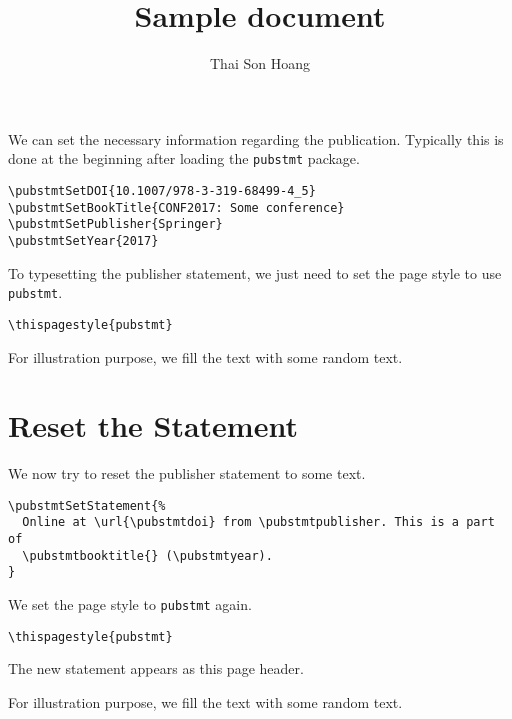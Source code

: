 \usepackage{lipsum}


\title{Sample document}
\author{Thai Son Hoang}
\maketitle

We can set the necessary information regarding the publication.
Typically this is done at the beginning after loading the \verb|pubstmt| package.
\begin{verbatim}
\pubstmtSetDOI{10.1007/978-3-319-68499-4_5}
\pubstmtSetBookTitle{CONF2017: Some conference}
\pubstmtSetPublisher{Springer}
\pubstmtSetYear{2017}
\end{verbatim}
To typesetting the publisher statement, we just need to set the page
style to use \verb|pubstmt|.
\begin{verbatim}
\thispagestyle{pubstmt}
\end{verbatim}
\thispagestyle{pubstmt}

For illustration purpose, we fill the text with some random text.
\begin{quote}
  \lipsum
\end{quote}

\section{Reset the Statement}
\label{sec:reset-statement}

We now try to reset the publisher statement to some text.
\begin{verbatim}
\pubstmtSetStatement{%
  Online at \url{\pubstmtdoi} from \pubstmtpublisher. This is a part of
  \pubstmtbooktitle{} (\pubstmtyear).
}
\end{verbatim}
 We set the page style to \verb|pubstmt| again.
\begin{verbatim}
\thispagestyle{pubstmt}
\end{verbatim}
\thispagestyle{pubstmt}
The new statement appears as this page header.

For illustration purpose, we fill the text with some random text.
\begin{quote}
  \lipsum
\end{quote}


